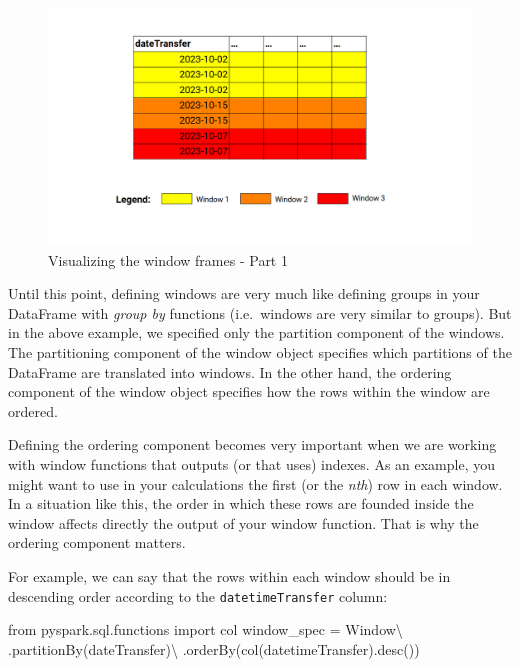 \documentclass[
  11pt,
  letterpaper,
  DIV=11,
  numbers=noendperiod]{scrreprt}
\newenvironment{Shaded}{\begin{snugshade}}{\end{snugshade}}
\newcommand{\ImportTok}[1]{\textcolor[rgb]{0.00,0.46,0.62}{#1}}
\newcommand{\NormalTok}[1]{\textcolor[rgb]{0.00,0.23,0.31}{#1}}
\newcommand{\OperatorTok}[1]{\textcolor[rgb]{0.37,0.37,0.37}{#1}}
\newcommand{\StringTok}[1]{\textcolor[rgb]{0.13,0.47,0.30}{#1}}
\begin{document}
\begin{figure}

{\centering \includegraphics[width=1\textwidth,height=\textheight]{Chapters/./../Figures/window-spec1.png}

}

\caption{\label{fig-window-spec1}Visualizing the window frames - Part 1}

\end{figure}

Until this point, defining windows are very much like defining groups in
your DataFrame with \emph{group by} functions (i.e.~windows are very
similar to groups). But in the above example, we specified only the
partition component of the windows. The partitioning component of the
window object specifies which partitions of the DataFrame are translated
into windows. In the other hand, the ordering component of the window
object specifies how the rows within the window are ordered.

Defining the ordering component becomes very important when we are
working with window functions that outputs (or that uses) indexes. As an
example, you might want to use in your calculations the first (or the
\emph{nth}) row in each window. In a situation like this, the order in
which these rows are founded inside the window affects directly the
output of your window function. That is why the ordering component
matters.

For example, we can say that the rows within each window should be in
descending order according to the \texttt{datetimeTransfer} column:

\begin{Shaded}
\begin{Highlighting}[]
\ImportTok{from}\NormalTok{ pyspark.sql.functions }\ImportTok{import}\NormalTok{ col}
\NormalTok{window\_spec }\OperatorTok{=}\NormalTok{ Window}\OperatorTok{\textbackslash{}}
\NormalTok{    .partitionBy(}\StringTok{\textquotesingle{}dateTransfer\textquotesingle{}}\NormalTok{)}\OperatorTok{\textbackslash{}}
\NormalTok{    .orderBy(col(}\StringTok{\textquotesingle{}datetimeTransfer\textquotesingle{}}\NormalTok{).desc())}
\end{Highlighting}
\end{Shaded}
\end{document}
